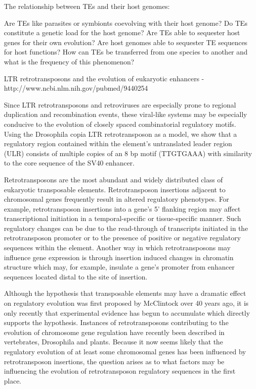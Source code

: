 The relationship between TEs and their host genomes:

Are TEs like parasites or symbionts coevolving with their host genome? Do TEs constitute a genetic load for the host genome? Are TEs able to sequester host genes for their own evolution? Are host genomes able to sequester TE sequences for host functions? How can TEs be transferred from one species to another and what is the frequency of this phenomenon?

LTR retrotransposons and the evolution of eukaryotic enhancers - http://www.ncbi.nlm.nih.gov/pubmed/9440254

Since LTR retrotransposons and retroviruses are especially prone to regional duplication and recombination events, these viral-like systems may be especially conducive to the evolution of closely spaced combinatorial regulatory motifs. Using the Drosophila copia LTR retrotransposon as a model, we show that a regulatory region contained within the element’s untranslated leader region (ULR) consists of multiple copies of an 8 bp motif (TTGTGAAA) with similarity to the core sequence of the SV40 enhancer.

Retrotransposons are the most abundant and widely distributed class of eukaryotic transposable elements. Retrotransposon insertions adjacent to chromosomal genes frequently result in altered regulatory phenotypes. For example, retrotransposon insertions into a gene’s 5’ flanking region may affect transcriptional initiation in a temporal-specific or tissue-specific manner. Such regulatory changes can be due to the read-through of transcripts initiated in the retrotransposon promoter or to the presence of positive or negative regulatory sequences within the element. Another way in which retrotransposons may influence gene expression is through insertion induced changes in chromatin structure which may, for example, insulate a gene’s promoter from enhancer sequences located distal to the site of insertion.

Although the hypothesis that transposable elements may have a dramatic effect on regulatory evolution was first proposed by McClintock over 40 years ago, it is only recently that experimental evidence has begun to accumulate which directly supports the hypothesis. Instances of retrotransposons contributing to the evolution of chromosome gene regulation have recently been described in vertebrates, Drosophila and plants. Because it now seems likely that the regulatory evolution of at least some chromosomal genes has been influenced by retrotransposon insertions, the question arises as to what factors may be influencing the evolution of retrotransposon regulatory sequences in the first place.

